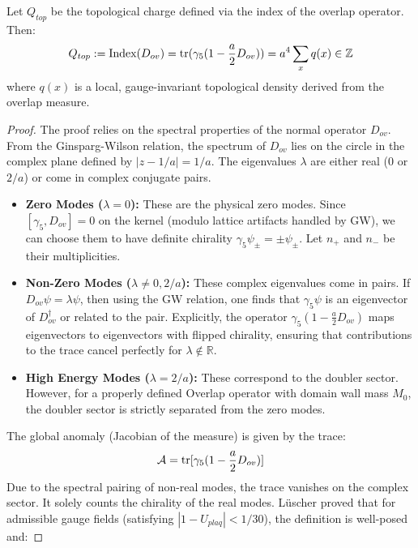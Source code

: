 \begin{theorem}
\label{thm:lattice_index}
Let $Q_{top}$ be the topological charge defined via the index of the overlap operator. Then:
\begin{equation}
Q_{top} := \text{Index}(D_{ov}) = \operatorname{tr}(\gamma_5 (1 - \frac{a}{2}D_{ov})) = a^4 \sum_x q(x) \in \mathbb{Z}
\end{equation}
where $q(x)$ is a local, gauge-invariant topological density derived from the overlap measure.
\end{theorem}

\begin{proof}
The proof relies on the spectral properties of the normal operator $D_{ov}$. From the Ginsparg-Wilson relation, the spectrum of $D_{ov}$ lies on the circle in the complex plane defined by $|z - 1/a| = 1/a$. The eigenvalues $\lambda$ are either real ($0$ or $2/a$) or come in complex conjugate pairs.
\begin{itemize}
    \item \textbf{Zero Modes ($\lambda = 0$):} These are the physical zero modes. Since $[\gamma_5, D_{ov}]=0$ on the kernel (modulo lattice artifacts handled by GW), we can choose them to have definite chirality $\gamma_5 \psi_{\pm} = \pm \psi_{\pm}$. Let $n_+$ and $n_-$ be their multiplicities.
    \item \textbf{Non-Zero Modes ($\lambda \neq 0, 2/a$):} These complex eigenvalues come in pairs. If $D_{ov}\psi = \lambda \psi$, then using the GW relation, one finds that $\gamma_5 \psi$ is an eigenvector of $D_{ov}^\dagger$ or related to the pair. Explicitly, the operator $\gamma_5 (1 - \frac{a}{2}D_{ov})$ maps eigenvectors to eigenvectors with flipped chirality, ensuring that contributions to the trace cancel perfectly for $\lambda \notin \mathbb{R}$.
    \item \textbf{High Energy Modes ($\lambda = 2/a$):} These correspond to the doubler sector. However, for a properly defined Overlap operator with domain wall mass $M_0$, the doubler sector is strictly separated from the zero modes.
\end{itemize}
The global anomaly (Jacobian of the measure) is given by the trace:
\begin{equation}
\mathcal{A} = \operatorname{tr} [\gamma_5 (1 - \frac{a}{2}D_{ov})]
\end{equation}
Due to the spectral pairing of non-real modes, the trace vanishes on the complex sector. It solely counts the chirality of the real modes. L\"uscher proved that for admissible gauge fields (satisfying $|1 - U_{plaq}| < 1/30$), the definition is well-posed and:

\end{proof}
